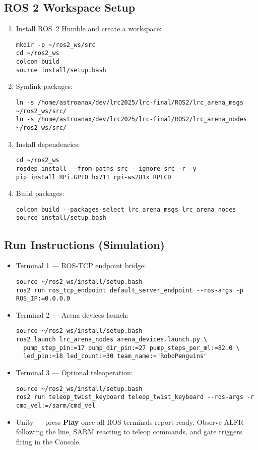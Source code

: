 \documentclass[12pt]{article}
\begin{document}
\subsection{ROS 2 Workspace Setup}
\begin{enumerate}
    \item Install ROS~2 Humble and create a workspace:
    \begin{verbatim}
mkdir -p ~/ros2_ws/src
cd ~/ros2_ws
colcon build
source install/setup.bash
    \end{verbatim}
    \item Symlink packages:
    \begin{verbatim}
ln -s /home/astroanax/dev/lrc2025/lrc-final/ROS2/lrc_arena_msgs ~/ros2_ws/src/
ln -s /home/astroanax/dev/lrc2025/lrc-final/ROS2/lrc_arena_nodes ~/ros2_ws/src/
    \end{verbatim}
    \item Install dependencies:
    \begin{verbatim}
cd ~/ros2_ws
rosdep install --from-paths src --ignore-src -r -y
pip install RPi.GPIO hx711 rpi-ws281x RPLCD
    \end{verbatim}
    \item Build packages:
    \begin{verbatim}
colcon build --packages-select lrc_arena_msgs lrc_arena_nodes
source install/setup.bash
    \end{verbatim}
\end{enumerate}

\subsection{Run Instructions (Simulation)}
\begin{itemize}
    \item Terminal 1 --- ROS-TCP endpoint bridge:
\begin{verbatim}
source ~/ros2_ws/install/setup.bash
ros2 run ros_tcp_endpoint default_server_endpoint --ros-args -p ROS_IP:=0.0.0.0
\end{verbatim}
    \item Terminal 2 --- Arena devices launch:
\begin{verbatim}
source ~/ros2_ws/install/setup.bash
ros2 launch lrc_arena_nodes arena_devices.launch.py \
  pump_step_pin:=17 pump_dir_pin:=27 pump_steps_per_ml:=82.0 \
  led_pin:=18 led_count:=30 team_name:="RoboPenguins"
\end{verbatim}
    \item Terminal 3 --- Optional teleoperation:
\begin{verbatim}
source ~/ros2_ws/install/setup.bash
ros2 run teleop_twist_keyboard teleop_twist_keyboard --ros-args -r cmd_vel:=/sarm/cmd_vel
\end{verbatim}
    \item Unity --- press \textbf{Play} once all ROS terminals report ready. Observe ALFR following the line, SARM reacting to teleop commands, and gate triggers firing in the Console.
\end{itemize}
\end{document}
